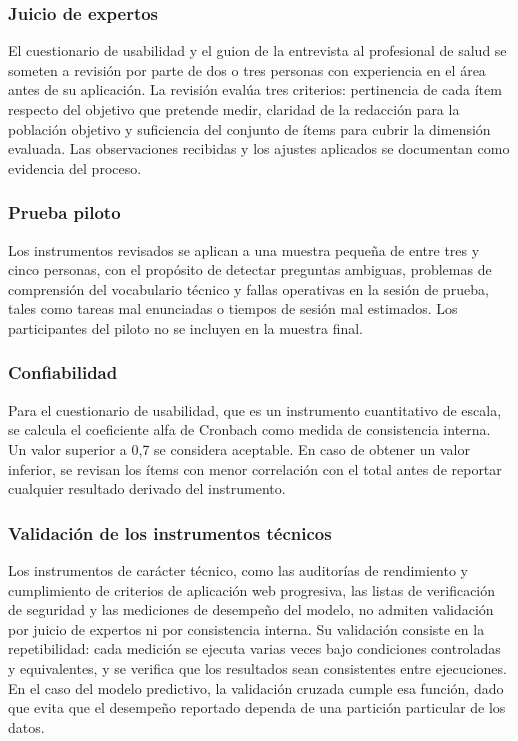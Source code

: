\documentclass[conference]{IEEEtran}
\begin{document}
\subsubsection{Juicio de expertos}
El cuestionario de usabilidad y el guion de la entrevista al profesional de salud se someten a revisión por parte de dos o tres personas con experiencia en el área antes de su aplicación. La revisión evalúa tres criterios: pertinencia de cada ítem respecto del objetivo que pretende medir, claridad de la redacción para la población objetivo y suficiencia del conjunto de ítems para cubrir la dimensión evaluada. Las observaciones recibidas y los ajustes aplicados se documentan como evidencia del proceso.

\subsubsection{Prueba piloto}
Los instrumentos revisados se aplican a una muestra pequeña de entre tres y cinco personas, con el propósito de detectar preguntas ambiguas, problemas de comprensión del vocabulario técnico y fallas operativas en la sesión de prueba, tales como tareas mal enunciadas o tiempos de sesión mal estimados. Los participantes del piloto no se incluyen en la muestra final.

\subsubsection{Confiabilidad}
Para el cuestionario de usabilidad, que es un instrumento cuantitativo de escala, se calcula el coeficiente alfa de Cronbach como medida de consistencia interna. Un valor superior a 0{,}7 se considera aceptable. En caso de obtener un valor inferior, se revisan los ítems con menor correlación con el total antes de reportar cualquier resultado derivado del instrumento.

\subsubsection{Validación de los instrumentos técnicos}
Los instrumentos de carácter técnico, como las auditorías de rendimiento y cumplimiento de criterios de aplicación web progresiva, las listas de verificación de seguridad y las mediciones de desempeño del modelo, no admiten validación por juicio de expertos ni por consistencia interna. Su validación consiste en la repetibilidad: cada medición se ejecuta varias veces bajo condiciones controladas y equivalentes, y se verifica que los resultados sean consistentes entre ejecuciones. En el caso del modelo predictivo, la validación cruzada cumple esa función, dado que evita que el desempeño reportado dependa de una partición particular de los datos.
\end{document}
